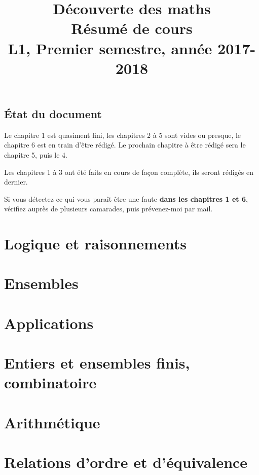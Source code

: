 \documentclass[10pt,a4paper]{book}
\theoremstyle{definition}
\begin{document}
\title{Découverte des maths\\
Résumé de cours\\
L1, Premier semestre, année 2017-2018}
\maketitle
\section{\'Etat du document}

Le chapitre 1 est quasiment fini, les chapitres 2 à 5 sont vides ou presque, le chapitre 6 est en train d'être rédigé. Le prochain chapitre à être rédigé sera le chapitre 5, puis le 4.


Les chapitres 1 à 3 ont été faits en cours de façon complète, ils seront rédigés en dernier.

Si vous détectez ce qui vous paraît être une faute \textbf{dans les chapitres 1 et 6}, vérifiez auprès de plusieurs camarades, puis prévenez-moi par mail.

\tableofcontents





\chapter{Logique et raisonnements}


\chapter{Ensembles}


\chapter{Applications}


\chapter{Entiers et ensembles finis, combinatoire}


\chapter{Arithmétique}


\chapter{Relations d'ordre et d'équivalence}

\end{document}

